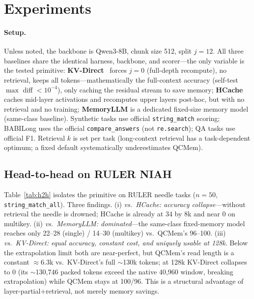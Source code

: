 \section{Experiments}
\label{sec:results}
\paragraph{Setup.} Unless noted, the backbone is Qwen3-8B, chunk size 512,
split $j{=}12$. All three baselines share the identical harness, backbone, and
scorer---the only variable is the tested primitive:
\textbf{KV-Direct}~\citep{residualstream} forces $j{=}0$ (full-depth
recompute), no retrieval, keeps all tokens---mathematically the full-context
accuracy (self-test $\max$ diff $<10^{-4}$), only caching the residual stream
to save memory; \textbf{HCache}~\citep{hcache} caches mid-layer activations and
recomputes upper layers post-hoc, but with no retrieval and no training;
\textbf{MemoryLLM} is a dedicated fixed-size memory model (same-class baseline).
Synthetic tasks use official \texttt{string\_match} scoring; BABILong uses the
official \texttt{compare\_answers} (not \texttt{re.search}); QA tasks use
official F1. Retrieval $k$ is set per task (long-context retrieval has a
task-dependent optimum; a fixed default systematically underestimates QCMem).



\subsection{Head-to-head on RULER NIAH}
Table~\ref{tab:h2h} isolates the primitive on RULER needle tasks ($n{=}50$,
\texttt{string\_match\_all}). Three findings. (i) \emph{vs.\ HCache: accuracy
collapse}---without retrieval the needle is drowned; HCache is already at 34 by
8k and near 0 on multikey. (ii) \emph{vs.\ MemoryLLM: dominated}---the
same-class fixed-memory model reaches only 22--28 (single) / 14--30 (multikey)
vs.\ QCMem's 96--100. (iii) \emph{vs.\ KV-Direct: equal accuracy, constant
cost, and uniquely usable at 128k}. Below the extrapolation limit both are
near-perfect, but QCMem's read length is a constant $\approx$6.3k vs.\
KV-Direct's full $\sim$130k tokens; at 128k KV-Direct collapses to 0 (its
$\sim$130{,}746 packed tokens exceed the native 40{,}960 window, breaking
extrapolation) while QCMem stays at 100/96. This is a structural advantage of
layer-partial{+}retrieval, not merely memory savings.



